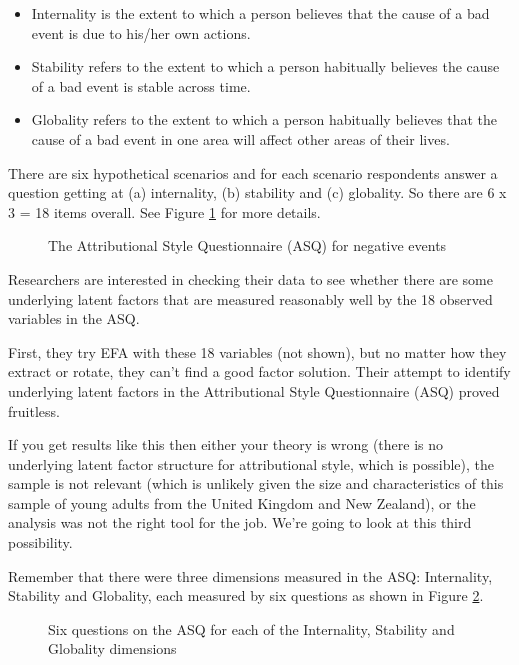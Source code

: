 \begin{itemize} \itemsep -2pt
\item Internality is the extent to which a person believes that the cause of a bad event is due to his/her own actions. 
\item Stability refers to the extent to which a person habitually believes the cause of a bad event is stable across time. 
\item Globality refers to the extent to which a person habitually believes that the cause of a bad event in one area will affect other areas of their lives.
\end{itemize}

There are six hypothetical scenarios and for each scenario respondents answer a question getting at (a) internality, (b) stability and (c) globality. So there are 6 x 3 = 18 items overall. See Figure \ref{fig:MTMM1} for more details.

\begin{figure}[!htb]
\begin{center}
\caption{The Attributional Style Questionnaire (ASQ) for negative events}
\label{fig:MTMM1}
\HR
\end{center}
\end{figure}

Researchers are interested in checking their data to see whether there are some underlying latent factors that are measured reasonably well by the 18 observed variables in the ASQ. 

First, they try EFA with these 18 variables (not shown), but no matter how they extract or rotate, they can’t find a good factor solution. Their attempt to identify underlying latent factors in the Attributional Style Questionnaire (ASQ) proved fruitless. 

If you get results like this then either your theory is wrong (there is no underlying latent factor structure for attributional style, which is possible), the sample is not relevant (which is unlikely given the size and characteristics of this sample of young adults from the United Kingdom and New Zealand), or the analysis was not the right tool for the job. We’re going to look at this third possibility.

Remember that there were three dimensions measured in the ASQ: Internality, Stability and Globality, each measured by six questions as shown in Figure \ref{fig:MTMM2}. 

\begin{figure}[!htb]
\begin{center}
\caption{Six questions on the ASQ for each of the Internality, Stability and Globality dimensions}
\label{fig:MTMM2}
\HR
\end{center}
\end{figure}

